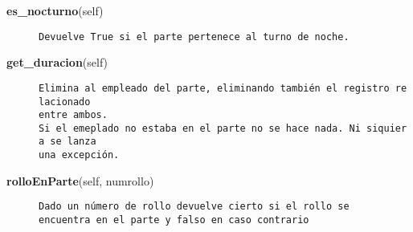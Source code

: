 \begin{description}\item[{\bf es\_nocturno}(self)]{\tt Devuelve~True~si~el~parte~pertenece~al~turno~de~noche.}\end{description}

\begin{description}\item[{\bf get\_duracion}(self)\end{description}

\begin{description}\item[{\bf removeEmpleado}(self, empleado)]{\tt Elimina~al~empleado~del~parte,~eliminando~también~el~registro~relacionado\\
entre~ambos.\\
Si~el~emeplado~no~estaba~en~el~parte~no~se~hace~nada.~Ni~siquiera~se~lanza~\\
una~excepción.}\end{description}

\begin{description}\item[{\bf rolloEnParte}(self, numrollo)]{\tt Dado~un~número~de~rollo~devuelve~cierto~si~el~rollo~se\\
encuentra~en~el~parte~y~falso~en~caso~contrario}\end{description}


